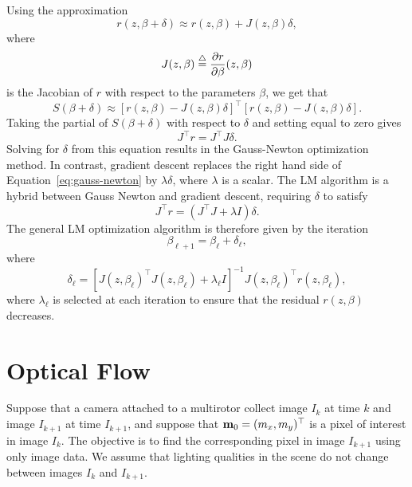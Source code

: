 Using the approximation 
\[
r(z, \beta+\delta) \approx r(z, \beta) + J(z, \beta)\delta,
\]
where 
\[
J(z, \beta) \stackrel{\triangle}{=} \frac{\partial r}{\partial \beta} (z, \beta)
\]
is the Jacobian of $r$ with respect to the parameters $\beta$, we get that
\[
S(\beta+\delta) \approx [r(z, \beta) - J(z, \beta)\delta]^\top [r(z, \beta)- J(z, \beta)\delta].
\]
Taking the partial of $S(\beta+\delta)$ with respect to $\delta$ and setting equal to zero gives
\begin{equation}\label{eq:gauss-newton}
J^\top r = J^\top J \delta.
\end{equation}
Solving for $\delta$ from this equation results in the Gauss-Newton optimization method.  In contrast, gradient descent replaces the right hand side of Equation~\eqref{eq:gauss-newton} by $\lambda\delta$, where $\lambda$ is a scalar. The LM algorithm is a hybrid between Gauss Newton and gradient descent, requiring $\delta$ to satisfy
\begin{equation}\label{eq:LM_lambda}
J^\top r = (J^\top J + \lambda I) \delta.
\end{equation}
The general LM optimization algorithm is therefore given by the iteration
\begin{equation}\label{eq:general_lm_alg}
\beta_{\ell+1} = \beta_\ell + \delta_\ell,
\end{equation}
where
\[
\delta_\ell = \left[J(z,\beta_\ell)^\top J(z,\beta_\ell) + \lambda_\ell I\right]^{-1} J(z,\beta_\ell)^\top r(z, \beta_\ell),
\]
where $\lambda_\ell$ is selected at each iteration to ensure that the residual $r(z, \beta)$ decreases.

\section{Optical Flow}
\label{sec:optical_flow}

Suppose that a camera attached to a multirotor collect image $I_k$ at time $k$ and image $I_{k+1}$ at time $I_{k+1}$, and suppose that $\mathbf{m}_0 = (m_x, m_y)^\top$ is a pixel of interest in image $I_k$.  The objective is to find the corresponding pixel in image $I_{k+1}$ using only image data.  We assume that lighting qualities in the scene do not change between images $I_k$ and $I_{k+1}$.  

